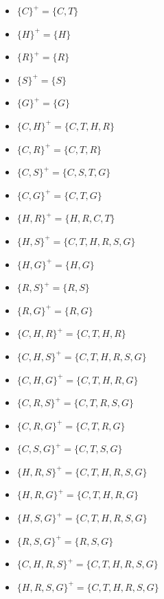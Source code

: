 \documentclass[12pt]{article}
\begin{document}
\begin{enumerate}[1.]
\begin{enumerate}[a)]
\begin{itemize}
\begin{enumerate}[1.]
\begin{itemize}
\begin{mdframed}
                        \begin{itemize}
                            \item $\{C\}^+ = \{C,T\}$
                            \item $\{H\}^+ = \{H\}$
                            \item $\{R\}^+ = \{R\}$
                            \item $\{S\}^+ = \{S\}$
                            \item $\{G\}^+ = \{G\}$
                            \item $\{C,H\}^+ = \{C,T,H,R\}$
                            \item $\{C,R\}^+ = \{C,T,R\}$
                            \item $\{C,S\}^+ = \{C,S,T,G\}$
                            \item $\{C,G\}^+ = \{C,T,G\}$
                            \item $\{H,R\}^+ = \{H,R,C,T\}$
                            \item $\{H,S\}^+ = \{C,T,H,R,S,G\}$
                            \item $\{H,G\}^+ = \{H,G\}$
                            \item $\{R,S\}^+ = \{R,S\}$
                            \item $\{R,G\}^+ = \{R,G\}$
                            \item $\{C,H,R\}^+ = \{C,T,H,R\}$
                            \item $\{C,H,S\}^+ = \{C,T,H,R,S,G\}$
                            \item $\{C,H,G\}^+ = \{C,T,H,R,G\}$
                            \item $\{C,R,S\}^+ = \{C,T,R,S,G\}$
                            \item $\{C,R,G\}^+ = \{C,T,R,G\}$
                            \item $\{C,S,G\}^+ = \{C,T,S,G\}$
                            \item $\{H,R,S\}^+ = \{C,T,H,R,S,G\}$
                            \item $\{H,R,G\}^+ = \{C,T,H,R,G\}$
                            \item $\{H,S,G\}^+ = \{C,T,H,R,S,G\}$
                            \item $\{R,S,G\}^+ = \{R,S,G\}$
                            \item $\{C,H,R,S\}^+ = \{C,T,H,R,S,G\}$
                            \item $\{H,R,S,G\}^+ = \{C,T,H,R,S,G\}$

\end{itemize}
\end{mdframed}
\end{itemize}
\end{enumerate}
\end{itemize}
\end{enumerate}
\end{enumerate}
\end{document}
